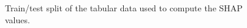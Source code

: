 \begin{figure}[H]
\centering
    \caption{Train/test split of the tabular data used to compute the SHAP values.}
    \label{fig:shap-train-test}
\end{figure}


